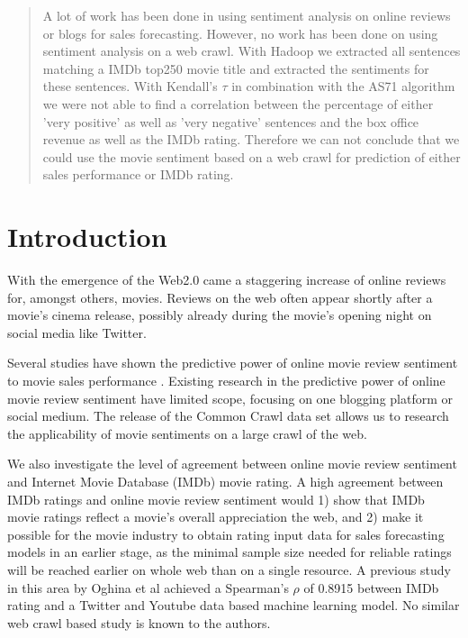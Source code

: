 \documentclass{acm_proc_article-sp}
\begin{document}
\maketitle
\begin{abstract}
A lot of work has been done in using sentiment analysis on online reviews or blogs for sales forecasting. However, no work has been done on using sentiment analysis on a web crawl. With Hadoop we extracted all sentences matching a IMDb top250 movie title and extracted the sentiments for these sentences. With Kendall's $\tau$ in combination with the AS71 algorithm we were not able to find a correlation between the percentage of either 'very positive' as well as 'very negative' sentences and the box office revenue as well as the IMDb rating. Therefore we can not conclude that we could use the movie sentiment based on a web crawl for prediction of either sales performance or IMDb rating.
\end{abstract}




\section{Introduction}
With the emergence of the Web2.0 came a staggering increase of online reviews for, amongst others, movies. Reviews on the web often appear shortly after a movie's cinema release, possibly already during the movie's opening night on social media like Twitter. 

Several studies have shown the predictive power of online movie review sentiment to movie sales performance \cite{Mishne2006, Liu2007, Dellarocas2007, Asur2010, Joshi2010, Yu2012}. Existing research in the predictive power of online movie review sentiment have limited scope, focusing on one blogging platform or social medium. The release of the Common Crawl data set allows us to research the applicability of movie sentiments on a large crawl of the web.  

We also investigate the level of agreement between online movie review sentiment and Internet Movie Database (IMDb) movie rating. A high agreement between IMDb ratings and online movie review sentiment would 1) show that IMDb movie ratings reflect a movie's overall appreciation the web, and 2) make it possible for the movie industry to obtain rating input data for sales forecasting models in an earlier stage, as the minimal sample size needed for reliable ratings will be reached earlier on whole web than on a single resource. A previous study in this area by Oghina et al \cite{Oghina2012} achieved a Spearman's $\rho$ of 0.8915 between IMDb rating and a Twitter and Youtube data based machine learning model. No similar web crawl based study is known to the authors.
\end{document}
